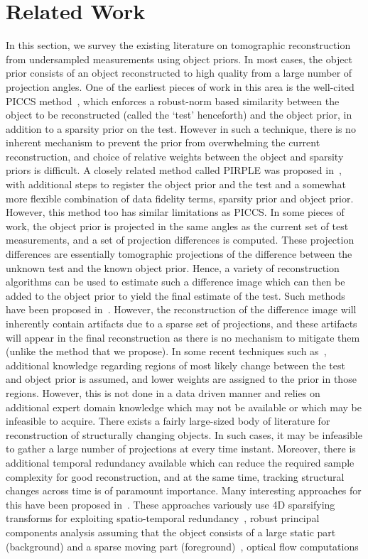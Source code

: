 \documentclass[journal]{IEEEtran}
\begin{document}
 \section{Related Work}
\label{sec:related}
In this section, we survey the existing literature on tomographic reconstruction from undersampled measurements using object priors. In most cases, the object prior consists of an object reconstructed to high quality from a large number of projection angles. One of the earliest pieces of work in this area is the well-cited PICCS method~\cite{PICCS}, which enforces a robust-norm based similarity between the object to be reconstructed (called the `test' henceforth) and the object prior, in addition to a sparsity prior on the test. However in such a technique, there is no inherent mechanism to prevent the prior from overwhelming the current reconstruction, and choice of relative weights between the object and sparsity priors is difficult. A closely related method called PIRPLE was proposed in~\cite{pirple}, with additional steps to register the object prior and the test and a somewhat more flexible combination of data fidelity terms, sparsity prior and object prior. However, this method too has similar limitations as PICCS. In some pieces of work, the object prior is projected in the same angles as the current set of test measurements, and a set of projection differences is computed. These projection differences are essentially tomographic projections of the difference between the unknown test and the known object prior. Hence, a variety of reconstruction algorithms can be used to estimate such a difference image which can then be added to the object prior to yield the final estimate of the test. Such methods have been proposed in~\cite{Pourmorteza2015,Lee2012}. However, the reconstruction of the difference image will inherently contain artifacts due to a sparse set of projections, and these artifacts will appear in the final reconstruction as there is no mechanism to mitigate them (unlike the method that we propose). In some recent techniques such as~\cite{Marjolein2016}, additional knowledge regarding regions of most likely change between the test and object prior is assumed, and lower weights are assigned to the prior in those regions. However, this is not done in a data driven manner and relies on additional expert domain knowledge which may not be available or which may be infeasible to acquire. There exists a fairly large-sized body of literature for reconstruction of structurally changing objects. In such cases, it may be infeasible to gather a large number of projections at every time instant. Moreover, there is additional temporal redundancy available which can reduce the required sample complexity for good reconstruction, and at the same time, tracking structural changes across time is of paramount importance. Many interesting approaches for this have been proposed in~\cite{daniil2015,koen2020, Van2015,HaoGao,Van2014}. These approaches variously use 4D sparsifying transforms for exploiting spatio-temporal redundancy~\cite{daniil2015}, robust principal components analysis assuming that the object consists of a large static part (background) and a sparse moving part (foreground)~\cite{HaoGao}, optical flow computations 
\end{document}

